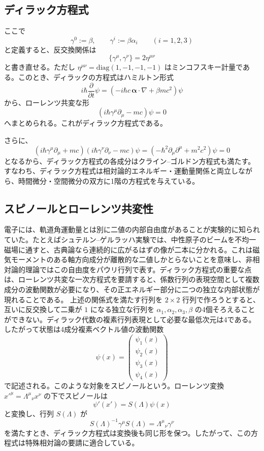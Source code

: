 \subsection{ディラック方程式}
ここで
\[
\gamma^0 := \beta,
\qquad
\gamma^i := \beta\alpha_i
\qquad (i=1,2,3)
\]
と定義すると、反交換関係は
\[
\{\gamma^\mu,\gamma^\nu\}=2\eta^{\mu\nu}
\]
と書き直せる。ただし $\eta^{\mu\nu}=\mathrm{diag}(1,-1,-1,-1)$ はミンコフスキー計量である。このとき、ディラックの方程式はハミルトン形式
\[
i\hbar \frac{\partial}{\partial t}\psi
=
\left(
-i\hbar c\,\boldsymbol{\alpha}\cdot \nabla + \beta mc^2
\right)\psi
\]
から、ローレンツ共変な形
\[
\left(i\hbar \gamma^\mu \partial_\mu - mc\right)\psi = 0
\]
へまとめられる。これがディラック方程式である。

さらに、
\[
\left(i\hbar \gamma^\mu \partial_\mu + mc\right)
\left(i\hbar \gamma^\nu \partial_\nu - mc\right)\psi
=
\left(-\hbar^2\partial_\mu\partial^\mu + m^2c^2\right)\psi
=0
\]
となるから、ディラック方程式の各成分はクライン--ゴルドン方程式も満たす。すなわち、ディラック方程式は相対論的エネルギー・運動量関係と両立しながら、時間微分・空間微分の双方に1階の方程式を与えている。

\subsection{スピノールとローレンツ共変性}
電子には、軌道角運動量とは別に二値の内部自由度があることが実験的に知られていた。たとえばシュテルン--ゲルラッハ実験では、中性原子のビームを不均一磁場に通すと、古典論なら連続的に広がるはずの像が二本に分かれる。これは磁気モーメントのある軸方向成分が離散的な二値しかとらないことを意味し、非相対論的理論ではこの自由度をパウリ行列で表す。ディラック方程式の重要な点は、ローレンツ共変な一次方程式を要請すると、係数行列の表現空間として複数成分の波動関数が必要になり、その正エネルギー部分に二つの独立な内部状態が現れることである。
上述の関係式を満たす行列を $2\times2$ 行列で作ろうとすると、互いに反交換して二乗が $1$ になる独立な行列を $\alpha_1,\alpha_2,\alpha_3,\beta$ の4個そろえることができない。ディラック代数の複素行列表現として必要な最低次元は4である。したがって状態は4成分複素ベクトル値の波動関数
\begin{equation}
    \psi(x) = \begin{pmatrix} \psi_1(x) \\ \psi_2(x) \\ \psi_3(x) \\ \psi_4(x) \end{pmatrix}
\end{equation}
で記述される。このような対象をスピノールという。ローレンツ変換 $x'^\mu=\Lambda^\mu{}_\nu x^\nu$ の下でスピノールは
\[
\psi'(x') = S(\Lambda)\psi(x)
\]
と変換し、行列 $S(\Lambda)$ が
\[
S(\Lambda)^{-1}\gamma^\mu S(\Lambda)
=
\Lambda^\mu{}_\nu \gamma^\nu
\]
を満たすとき、ディラック方程式は変換後も同じ形を保つ。したがって、この方程式は特殊相対論の要請に適合している。

